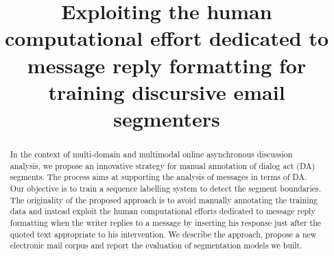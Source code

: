 \documentclass[11pt]{article}
\title{Exploiting the human computational effort dedicated to message reply formatting for training discursive email segmenters} %
\author{}
\date{}
\begin{document}
\maketitle
\begin{abstract}
In the context of multi-domain and multimodal online asynchronous discussion analysis, we propose an innovative strategy for manual annotation of dialog act (DA) segments. The process aims at supporting the analysis of messages in terms of DA.
Our objective is to train a sequence labelling system to detect the segment boundaries. %
The originality of the proposed approach is to avoid manually annotating the training data and instead exploit the human computational efforts dedicated to message reply formatting %
when the writer replies to a message by inserting his response just after the quoted text appropriate to his intervention.
%
We describe the approach, propose a new electronic mail corpus %
and report the evaluation of segmentation models we built.
\end{abstract}



















\end{document}
